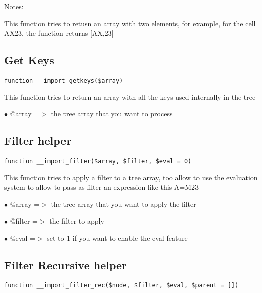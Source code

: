 \documentclass[a4paper]{book}
\begin{document}
Notes:

This function tries to retusn an array with two elements, for example, for
the cell AX23, the function returns [AX,23]

\hypertarget{toc179}{}
\subsection{Get Keys}

\begin{lstlisting}
function __import_getkeys($array)
\end{lstlisting}

This function tries to return an array with all the keys used internally
in the tree

\begin{compactitem}
\item[\color{myblue}$\bullet$] @array =$>$ the tree array that you want to process
\end{compactitem}

\hypertarget{toc180}{}
\subsection{Filter helper}

\begin{lstlisting}
function __import_filter($array, $filter, $eval = 0)
\end{lstlisting}

This function tries to apply a filter to a tree array, too allow to use
the evaluation system to allow to pass as filter an expression like this
A=M23

\begin{compactitem}
\item[\color{myblue}$\bullet$] @array  =$>$ the tree array that you want to apply the filter
\item[\color{myblue}$\bullet$] @filter =$>$ the filter to apply
\item[\color{myblue}$\bullet$] @eval   =$>$ set to 1 if you want to enable the eval feature
\end{compactitem}

\hypertarget{toc181}{}
\subsection{Filter Recursive helper}

\begin{lstlisting}
function __import_filter_rec($node, $filter, $eval, $parent = [])
\end{lstlisting}
\end{document}
